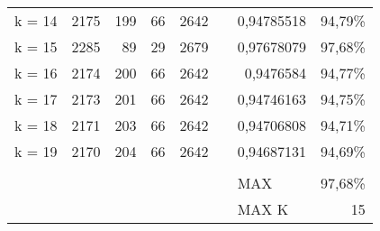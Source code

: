 \documentclass{article}
\begin{document}
\begin{table}[htbp]
\begin{tabular}{rrrrrrlr}
    \multicolumn{1}{l}{k = 14} & 2175  & 199   & 66    & 2642  &       & \multicolumn{1}{r}{0,94785518} & 94,79\% \\
    \multicolumn{1}{l}{k = 15} & 2285  & 89    & 29    & 2679  &       & \multicolumn{1}{r}{0,97678079} & 97,68\% \\
    \multicolumn{1}{l}{k = 16} & 2174  & 200   & 66    & 2642  &       & \multicolumn{1}{r}{0,9476584} & 94,77\% \\
    \multicolumn{1}{l}{k = 17} & 2173  & 201   & 66    & 2642  &       & \multicolumn{1}{r}{0,94746163} & 94,75\% \\
    \multicolumn{1}{l}{k = 18} & 2171  & 203   & 66    & 2642  &       & \multicolumn{1}{r}{0,94706808} & 94,71\% \\
    \multicolumn{1}{l}{k = 19} & 2170  & 204   & 66    & 2642  &       & \multicolumn{1}{r}{0,94687131} & 94,69\% \\
          &       &       &       &       &       &       &  \\
          &       &       &       &       &       & MAX   & 97,68\% \\
          &       &       &       &       &       & MAX K & 15 \\
    \end{tabular}%
  \label{tab:addlabel}%
\end{table}%
\end{document}
